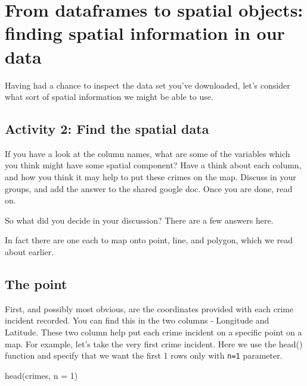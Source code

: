 \documentclass[
]{book}
\newenvironment{Shaded}{\begin{snugshade}}{\end{snugshade}}
\newcommand{\AttributeTok}[1]{\textcolor[rgb]{0.77,0.63,0.00}{#1}}
\newcommand{\DecValTok}[1]{\textcolor[rgb]{0.00,0.00,0.81}{#1}}
\newcommand{\FunctionTok}[1]{\textcolor[rgb]{0.00,0.00,0.00}{#1}}
\newcommand{\NormalTok}[1]{#1}
\begin{document}
\hypertarget{from-dataframes-to-spatial-objects-finding-spatial-information-in-our-data}{%
\section{From dataframes to spatial objects: finding spatial information in our data}\label{from-dataframes-to-spatial-objects-finding-spatial-information-in-our-data}}

Having had a chance to inspect the data set you've downloaded, let's consider what sort of spatial information we might be able to use.

\hypertarget{activity-2-find-the-spatial-data}{%
\subsection{Activity 2: Find the spatial data}\label{activity-2-find-the-spatial-data}}

If you have a look at the column names, what are some of the variables which you think might have some spatial component? Have a think about each column, and how you think it may help to put these crimes on the map. Discuss in your groups, and add the answer to the shared google doc. Once you are done, read on.

So what did you decide in your discussion? There are a few answers here.

In fact there are one each to map onto point, line, and polygon, which we read about earlier.

\hypertarget{the-point}{%
\subsection{The point}\label{the-point}}

First, and possibly most obvious, are the coordinates provided with each crime incident recorded. You can find this in the two columns - Longitude and Latitude. These two column help put each crime incident on a specific point on a map. For example, let's take the very first crime incident. Here we use the head() function and specify that we want the first 1 rows only with \texttt{n=1} parameter.

\begin{Shaded}
\begin{Highlighting}[]
\FunctionTok{head}\NormalTok{(crimes, }\AttributeTok{n =} \DecValTok{1}\NormalTok{)}
\end{Highlighting}
\end{Shaded}
\end{document}
